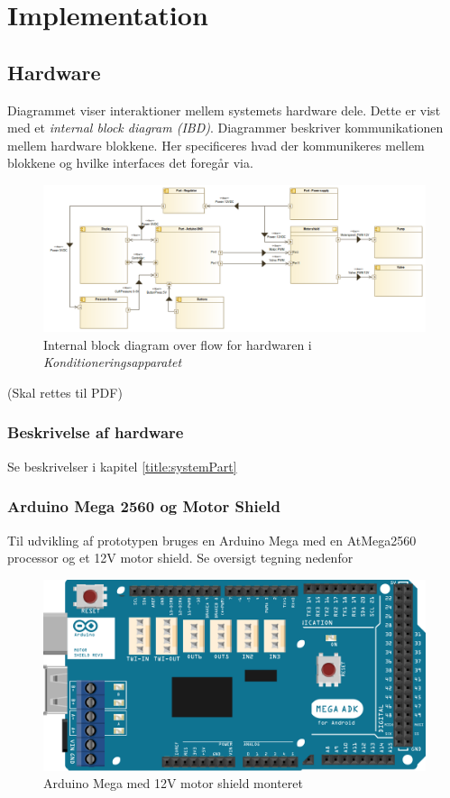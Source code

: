 \section{Implementation}

\subsection{Hardware}
Diagrammet viser interaktioner mellem systemets hardware dele. Dette er vist med et \textit{internal block diagram (IBD)}. Diagrammer beskriver kommunikationen mellem hardware blokkene. Her specificeres hvad der kommunikeres mellem blokkene og hvilke interfaces det foregår via. \\
\begin{figure}[H]
	\includegraphics[width=\textwidth]{SystemArkitektur/pdfs/InternalBlockdiagram(Hardware).png}
	\caption{Internal block diagram over flow for hardwaren i \textit{Konditioneringsapparatet}}
\end{figure}
(Skal rettes til PDF)

\subsubsection{Beskrivelse af hardware}
Se beskrivelser i kapitel \ref{title:systemPart}

\subsubsection{Arduino Mega 2560 og Motor Shield}
Til udvikling af prototypen bruges en Arduino Mega med en AtMega2560 processor og et 12V motor shield. Se oversigt tegning nedenfor \\
\begin{figure}[H]
	\includegraphics[width=\textwidth]{SystemArkitektur/pdfs/MegaPlusShield-crop.pdf}
	\caption{Arduino Mega med 12V motor shield monteret}
\end{figure}


